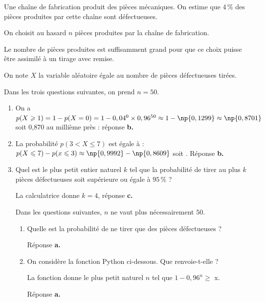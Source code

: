 \medskip










Une chaîne de fabrication produit des pièces mécaniques. On estime que 4\,\% des pièces produites par cette chaîne sont défectueuses.

On choisit au hasard $n$ pièces produites par la chaîne de fabrication. 

Le nombre de pièces produites est suffisamment grand pour que ce choix puisse être assimilé à un tirage avec remise. 

On note $X$ la variable aléatoire égale au nombre de pièces défectueuses tirées.

Dans les trois questions suivantes, on prend $n = 50$.

\medskip

\begin{enumerate}
\item 
On a $p(X\geqslant 1) = 1 - p(X = 0) = 1 - 0,04^0 \times 0,96^{50} \approx 1 - \np{0,1299} \approx \np{0,8701}$ soit 0,870 au millième près : réponse \textbf{b.~~}






\item La probabilité $p(3 < X \leqslant 7)$ est égale à :
$p(X \leqslant 7) - p(x \leqslant 3) \approx \np{0,9992} - \np{0,8609}$ soit . Réponse \textbf{b.~~}








\item Quel est le plus petit entier naturel $k$ tel que la probabilité de tirer au plus $k$ pièces défectueuses soit supérieure ou égale à $95\,\%$ ?







La calculatrice donne $k = 4$, réponse \textbf{c.}

Dans les questions suivantes, $n$ ne vaut plus nécessairement $50$.

\begin{enumerate}[resume]
\item Quelle est la probabilité de ne tirer que des pièces défectueuses ?






Réponse \textbf{a.}
\item On considère la fonction Python ci-dessous. Que renvoie-t-elle ?
















La fonction donne le plus petit naturel $n$ tel que $1 - 0,96^n \geqslant $ x.

Réponse \textbf{a.}
	\end{enumerate}
\end{enumerate}
